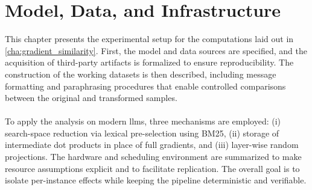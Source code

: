 \chapter{Model, Data, and Infrastructure}
This chapter presents the experimental setup for the computations laid out in \autoref{cha:gradient_similarity}. First, the model and data sources are specified, and the acquisition of third-party artifacts is formalized to ensure reproducibility. The construction of the working datasets is then described, including message formatting and paraphrasing procedures that enable controlled comparisons between the original and transformed samples.
\\\\
To apply the analysis on modern \acrshort{llm}s, three mechanisms are employed: (i) search-space reduction via lexical pre-selection using BM25, (ii) storage of intermediate dot products in place of full gradients, and (iii) layer-wise random projections. The hardware and scheduling environment are summarized to make resource assumptions explicit and to facilitate replication. The overall goal is to isolate per-instance effects while keeping the pipeline deterministic and verifiable.

